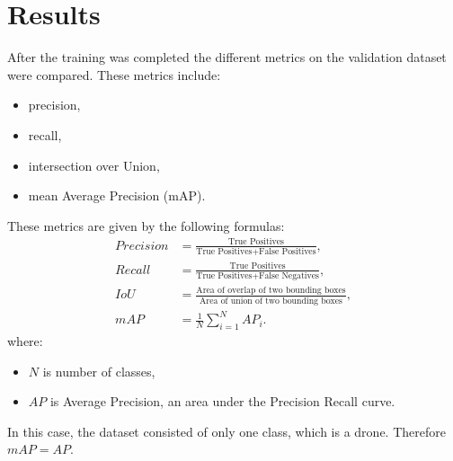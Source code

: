 \documentclass[twoside]{ctuthesis}
\theoremstyle{plain}
\theoremstyle{definition}
\theoremstyle{note}
\begin{document}
\chapter{Results}
After the training was completed the different metrics on the validation dataset were compared. These metrics include:
\begin{itemize}
	\item precision,
	\item recall,
	\item intersection over Union,
	\item mean Average Precision (mAP).
\end{itemize}
These metrics are given by the following formulas:
\begin{equation}
\begin{aligned}
	Precision &= \frac{\text{True Positives}}{\text{True Positives} + \text{False Positives}},\\
	Recall &= \frac{\text{True Positives}}{\text{True Positives} + \text{False Negatives}},\\
	IoU &= \frac{\text{Area of overlap of two bounding boxes}}{\text{Area of union of two bounding boxes}},\\
	mAP &= \frac{1}{N}\sum^N_{i=1}AP_i.
\end{aligned}
\end{equation}
where:
\begin{itemize}
	\item $N$ is number of classes,
	\item $AP$ is Average Precision, an area under the Precision Recall curve.
\end{itemize}
In this case, the dataset consisted of only one class, which is a drone. Therefore $mAP=AP$.
\end{document}
